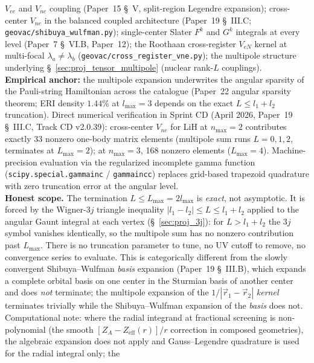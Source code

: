 $V_{ee}$ and $V_{ne}$ coupling (Paper~15 \S~V, split-region Legendre
expansion); cross-center $V_{ne}$ in the balanced coupled architecture
(Paper~19 \S~III.C; \texttt{geovac/shibuya\_wulfman.py}); single-center
Slater $F^k$ and $G^k$ integrals at every level (Paper~7 \S~VI.B,
Paper~12); the Roothaan cross-register $V_{eN}$ kernel at multi-focal
$\lambda_a \ne \lambda_b$ (\texttt{geovac/cross\_register\_vne.py});
the multipole structure underlying \S~\ref{sec:proj_tensor_multipole}
(nuclear rank-$L$ couplings).\\
\textbf{Empirical anchor:} the multipole expansion underwrites the
angular sparsity of the Pauli-string Hamiltonian across the catalogue
(Paper~22 angular sparsity theorem; ERI density $1.44\%$ at
$l_\text{max} = 3$ depends on the exact $L \leq l_1 + l_2$
truncation).  Direct numerical verification in Sprint CD (April 2026,
Paper~19 \S~III.C, Track CD v2.0.39): cross-center $V_{ne}$ for LiH at
$n_\text{max} = 2$ contributes exactly 33 nonzero one-body matrix
elements (multipole sum runs $L = 0, 1, 2$, terminates at $L_\text{max}
= 2$); at $n_\text{max} = 3$, 168 nonzero elements ($L_\text{max} =
4$).  Machine-precision evaluation via the regularized incomplete
gamma function (\texttt{scipy.special.gammainc} / \texttt{gammaincc})
replaces grid-based trapezoid quadrature with zero truncation error at
the angular level.\\
\textbf{Honest scope.}  The termination $L \leq L_\text{max} =
2 l_\text{max}$ is \emph{exact}, not asymptotic.  It is forced by the
Wigner-$3j$ triangle inequality $|l_1 - l_2| \leq L \leq l_1 + l_2$
applied to the angular Gaunt integral at each vertex
(\S~\ref{sec:proj_3j}): for $L > l_1 + l_2$ the $3j$ symbol vanishes
identically, so the multipole sum has no nonzero contribution past
$L_\text{max}$.  There is no truncation parameter to tune, no UV
cutoff to remove, no convergence series to evaluate.  This is
categorically different from the slowly convergent Shibuya--Wulfman
\emph{basis} expansion (Paper~19 \S~III.B), which expands a complete
orbital basis on one center in the Sturmian basis of another center
and does \emph{not} terminate; the multipole expansion of the
$1/|\vec{r}_1 - \vec{r}_2|$ \emph{kernel} terminates trivially while
the Shibuya--Wulfman expansion of the \emph{basis} does not.
Computational note: where the radial integrand at fractional screening
is non-polynomial (the smooth $[Z_A - Z_\text{eff}(r)]/r$ correction
in composed geometries), the algebraic expansion does not apply and
Gauss--Legendre quadrature is used for the radial integral only; the
